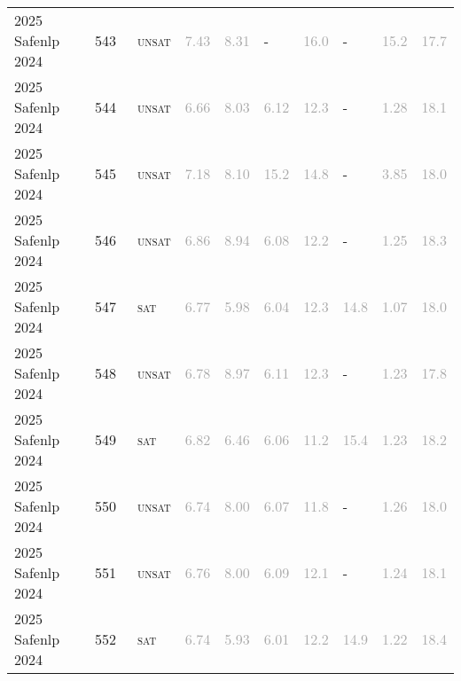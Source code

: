 \begin{center}
{\begin{longtable}{@{}llllllllll@{}}
2025 Safenlp 2024 & 543 & ~\textsc{unsat} & \textcolor{darkgray}{7.43} & \textcolor{darkgray}{8.31} & - & \textcolor{darkgray}{16.0} & - & \textcolor{darkgray}{15.2} & \textcolor{darkgray}{17.7} \\
2025 Safenlp 2024 & 544 & ~\textsc{unsat} & \textcolor{darkgray}{6.66} & \textcolor{darkgray}{8.03} & \textcolor{darkgray}{6.12} & \textcolor{darkgray}{12.3} & - & \textcolor{darkgray}{1.28} & \textcolor{darkgray}{18.1} \\
2025 Safenlp 2024 & 545 & ~\textsc{unsat} & \textcolor{darkgray}{7.18} & \textcolor{darkgray}{8.10} & \textcolor{darkgray}{15.2} & \textcolor{darkgray}{14.8} & - & \textcolor{darkgray}{3.85} & \textcolor{darkgray}{18.0} \\
2025 Safenlp 2024 & 546 & ~\textsc{unsat} & \textcolor{darkgray}{6.86} & \textcolor{darkgray}{8.94} & \textcolor{darkgray}{6.08} & \textcolor{darkgray}{12.2} & - & \textcolor{darkgray}{1.25} & \textcolor{darkgray}{18.3} \\
2025 Safenlp 2024 & 547 & ~\textsc{sat} & \textcolor{darkgray}{6.77} & \textcolor{darkgray}{5.98} & \textcolor{darkgray}{6.04} & \textcolor{darkgray}{12.3} & \textcolor{darkgray}{14.8} & \textcolor{darkgray}{1.07} & \textcolor{darkgray}{18.0} \\
2025 Safenlp 2024 & 548 & ~\textsc{unsat} & \textcolor{darkgray}{6.78} & \textcolor{darkgray}{8.97} & \textcolor{darkgray}{6.11} & \textcolor{darkgray}{12.3} & - & \textcolor{darkgray}{1.23} & \textcolor{darkgray}{17.8} \\
2025 Safenlp 2024 & 549 & ~\textsc{sat} & \textcolor{darkgray}{6.82} & \textcolor{darkgray}{6.46} & \textcolor{darkgray}{6.06} & \textcolor{darkgray}{11.2} & \textcolor{darkgray}{15.4} & \textcolor{darkgray}{1.23} & \textcolor{darkgray}{18.2} \\
2025 Safenlp 2024 & 550 & ~\textsc{unsat} & \textcolor{darkgray}{6.74} & \textcolor{darkgray}{8.00} & \textcolor{darkgray}{6.07} & \textcolor{darkgray}{11.8} & - & \textcolor{darkgray}{1.26} & \textcolor{darkgray}{18.0} \\
2025 Safenlp 2024 & 551 & ~\textsc{unsat} & \textcolor{darkgray}{6.76} & \textcolor{darkgray}{8.00} & \textcolor{darkgray}{6.09} & \textcolor{darkgray}{12.1} & - & \textcolor{darkgray}{1.24} & \textcolor{darkgray}{18.1} \\
2025 Safenlp 2024 & 552 & ~\textsc{sat} & \textcolor{darkgray}{6.74} & \textcolor{darkgray}{5.93} & \textcolor{darkgray}{6.01} & \textcolor{darkgray}{12.2} & \textcolor{darkgray}{14.9} & \textcolor{darkgray}{1.22} & \textcolor{darkgray}{18.4} \\

\end{longtable}}
\end{center}
